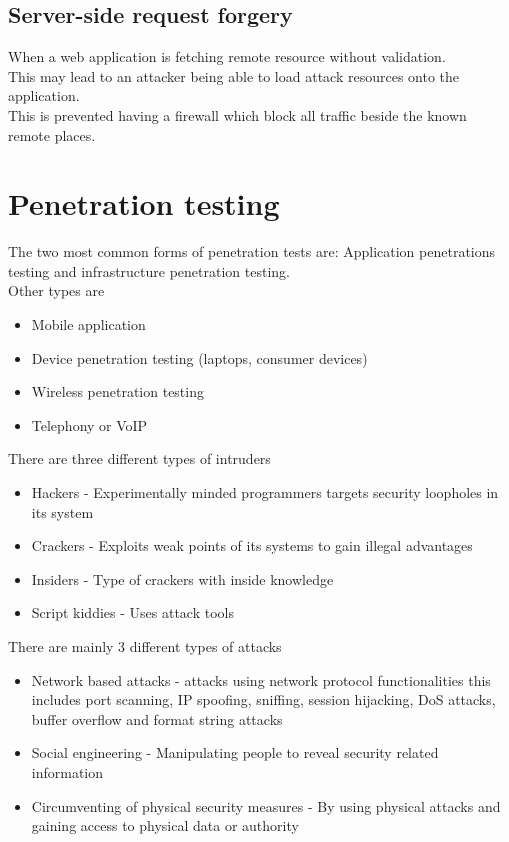 \documentclass[12pt, a4paper]{article}
\begin{document}
		\subsection{Server-side request forgery}
			When a web application is fetching remote resource without validation.\\
			This may lead to an attacker being able to load attack resources onto the application.\\
			This is prevented having a firewall which block all traffic beside the known remote places.\\
	\section{Penetration testing}
		The two most common forms of penetration tests are:
		Application penetrations testing and infrastructure penetration testing.\\
		Other types are
		\begin{itemize}
			\item Mobile application
			\item Device penetration testing (laptops, consumer devices)
			\item Wireless penetration testing
			\item Telephony or VoIP 
		\end{itemize}
		There are three different types of intruders
		\begin{itemize}
			\item Hackers - Experimentally minded programmers targets security loopholes in its system
			\item Crackers - Exploits weak points of its systems to gain illegal advantages
			\item Insiders - Type of crackers with inside knowledge
			\item Script kiddies - Uses attack tools
		\end{itemize}
		There are mainly 3 different types of attacks
		\begin{itemize}
			\item Network based attacks - attacks using network protocol functionalities this includes port scanning, IP spoofing, sniffing, session hijacking, DoS attacks, buffer overflow and format string attacks
			\item Social engineering - Manipulating people to reveal security related information 
			\item Circumventing of physical security measures - By using physical attacks and gaining access to physical data or authority
		\end{itemize}
\end{document}
